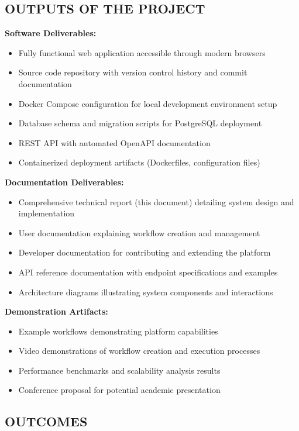 \documentclass[12pt]{article}
\begin{document}
\subsection{OUTPUTS OF THE PROJECT}

\textbf{Software Deliverables:}
\begin{itemize}
    \item Fully functional web application accessible through modern browsers
    \item Source code repository with version control history and commit documentation
    \item Docker Compose configuration for local development environment setup
    \item Database schema and migration scripts for PostgreSQL deployment
    \item REST API with automated OpenAPI documentation
    \item Containerized deployment artifacts (Dockerfiles, configuration files)
\end{itemize}

\textbf{Documentation Deliverables:}
\begin{itemize}
    \item Comprehensive technical report (this document) detailing system design and implementation
    \item User documentation explaining workflow creation and management
    \item Developer documentation for contributing and extending the platform
    \item API reference documentation with endpoint specifications and examples
    \item Architecture diagrams illustrating system components and interactions
\end{itemize}

\textbf{Demonstration Artifacts:}
\begin{itemize}
    \item Example workflows demonstrating platform capabilities
    \item Video demonstrations of workflow creation and execution processes
    \item Performance benchmarks and scalability analysis results
    \item Conference proposal for potential academic presentation
\end{itemize}

\subsection{OUTCOMES}
\end{document}
